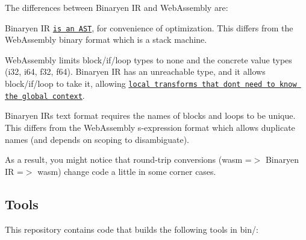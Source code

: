 The differences between Binaryen IR and Web\+Assembly are\+:


\begin{DoxyItemize}
\item Binaryen IR \href{https://github.com/WebAssembly/binaryen/issues/663}{\tt is an A\+ST}, for convenience of optimization. This differs from the Web\+Assembly binary format which is a stack machine.
\item Web\+Assembly limits block/if/loop types to none and the concrete value types (i32, i64, f32, f64). Binaryen IR has an unreachable type, and it allows block/if/loop to take it, allowing \href{https://github.com/WebAssembly/binaryen/issues/903}{\tt local transforms that don\textquotesingle{}t need to know the global context}.
\item Binaryen IR\textquotesingle{}s text format requires the names of blocks and loops to be unique. This differs from the Web\+Assembly s-\/expression format which allows duplicate names (and depends on scoping to disambiguate).
\end{DoxyItemize}

As a result, you might notice that round-\/trip conversions (wasm =$>$ Binaryen IR =$>$ wasm) change code a little in some corner cases.

\subsection*{Tools}

This repository contains code that builds the following tools in {\ttfamily bin/}\+:


